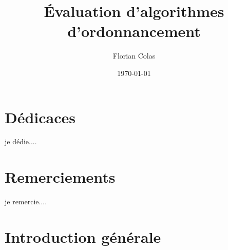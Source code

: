 \documentclass[a4paper,12pt]{report}
\title{Évaluation d'algorithmes d'ordonnancement}
\author{Florian Colas}
\date{\today}
\theoremstyle{plain}				%
\theoremstyle{definition}				%
\begin{document}

\maketitle

\section*{Dédicaces} \label{sec:dedicace}
je dédie....

\section*{Remerciements} \label{sec:remerciements}
je remercie....

%
%
%
\renewcommand{\thesection}{\arabic{section}}
\renewcommand{\contentsname}{Sommaire}
\setcounter{tocdepth}{3}	%
\setcounter{secnumdepth}{3}	%
\tableofcontents


\bigskip


\section{Introduction générale} \label{sec:introductionGenerale}

\end{document}
